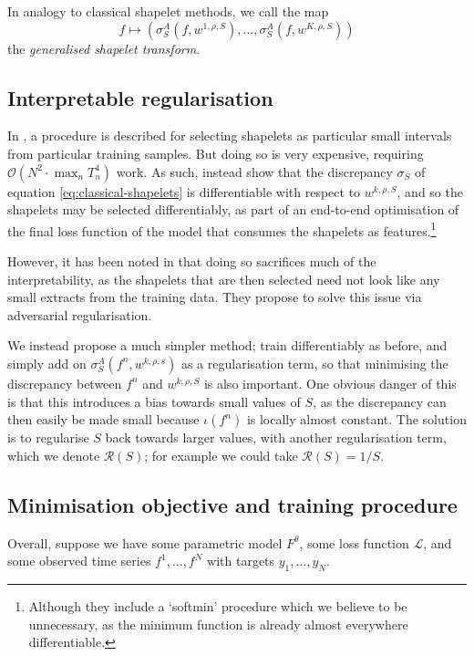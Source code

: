 \documentclass{article}
\theoremstyle{plain}
\theoremstyle{definition}
\newcommand{\bigO}{\mathcal{O}}
\begin{document}
	
	In analogy to classical shapelet methods, we call the map
	\begin{equation*}
	f \mapsto (\sigma^A_S(f, w^{1, \rho, S}), \ldots, \sigma^A_S(f, w^{K, \rho, S}))
	\end{equation*}
	the \emph{generalised shapelet transform}.
	
	\subsection{Interpretable regularisation}
	In \cite{TODO}, a procedure is described for selecting shapelets as particular small intervals from particular training samples. But doing so is very expensive, requiring $\bigO(N^2 \cdot \max_n T_n^4)$ work. As such, \cite{TODO} instead show that the discrepancy $\sigma_S$ of equation \eqref{eq:classical-shapelets} is differentiable with respect to $w^{k, \rho, S}$, and so the shapelets may be selected differentiably, as part of an end-to-end optimisation of the final loss function of the model that consumes the shapelets as features.\footnote{Although they include a `softmin' procedure which we believe to be unnecessary, as the minimum function is already almost everywhere differentiable.}
	
	However, it has been noted in \cite{TODO} that doing so sacrifices much of the interpretability, as the shapelets that are then selected need not look like any small extracts from the training data. They propose to solve this issue via adversarial regularisation.
	
	We instead propose a much simpler method; train differentiably as before, and simply add on $\sigma^A_S(f^n, w^{k, \rho, s})$ as a regularisation term, so that minimising the discrepancy between $f^n$ and $w^{k, \rho, S}$ is also important. One obvious danger of this is that this introduces a bias towards small values of $S$, as the discrepancy can then easily be made small because $\iota(f^n)$ is locally almost constant. The solution is to regularise $S$ back towards larger values, with another regularisation term, which we denote $\mathcal{R}(S)$; for example we could take $\mathcal{R}(S) = 1/S$.
	
	\subsection{Minimisation objective and training procedure}
	Overall, suppose we have some parametric model $F^\theta$, some loss function $\mathcal{L}$, and some observed time series $f^1, \ldots, f^N$ with targets $y_1, \ldots, y_N$.	
	
\end{document}
